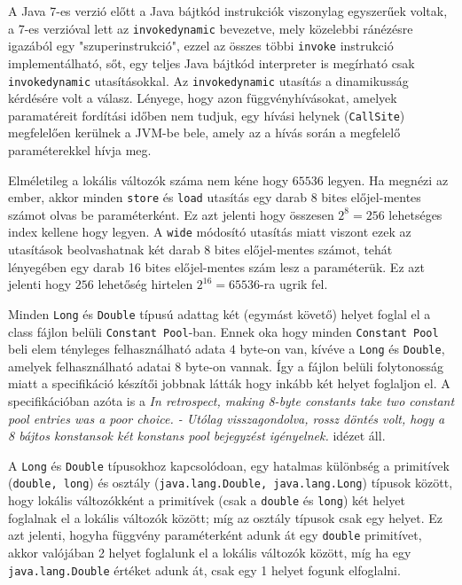 \begin{compactitem}
 \item A Java 7-es verzió előtt a Java bájtkód instrukciók viszonylag egyszerűek voltak, a 7-es verzióval lett az \lstinline{invokedynamic} bevezetve, mely közelebbi ránézésre igazából egy "szuperinstrukció", ezzel az összes többi \lstinline{invoke} instrukció implementálható, sőt, egy teljes Java bájtkód interpreter is megírható csak \lstinline{invokedynamic} utasításokkal. Az \lstinline{invokedynamic} utasítás a dinamikusság kérdésére volt a válasz. Lényege, hogy azon függvényhívásokat, amelyek paramatéreit fordítási időben nem tudjuk, egy hívási helynek (\lstinline{CallSite}) megfelelően kerülnek a JVM-be bele, amely az a hívás során a megfelelő paraméterekkel hívja meg.
 \item Elméletileg a lokális változók száma nem kéne hogy $65536$ legyen. Ha megnézi az ember, akkor minden \lstinline{store} és \lstinline{load} utasítás egy darab 8 bites előjel-mentes számot olvas be paraméterként. Ez azt jelenti hogy összesen $2^{8} = 256$ lehetséges index kellene hogy legyen. A \lstinline{wide} módosító utasítás miatt viszont ezek az utasítások beolvashatnak két darab 8 bites előjel-mentes számot, tehát lényegében egy darab 16 bites előjel-mentes szám lesz a paraméterük. Ez azt jelenti hogy $256$ lehetőség hirtelen $2^{16} = 65536$-ra ugrik fel.
 \item Minden \lstinline{Long} és \lstinline{Double} típusú adattag két (egymást követő) helyet foglal el a class fájlon belüli \lstinline{Constant Pool}-ban. Ennek oka hogy minden \lstinline{Constant Pool} beli elem tényleges felhasználható adata $4$ byte-on van, kívéve a \lstinline{Long} és \lstinline{Double}, amelyek felhasználható adatai $8$ byte-on vannak. Így a fájlon belüli folytonosság miatt a specifikáció készítői jobbnak látták hogy inkább két helyet foglaljon el. A specifikációban azóta is a \textit{In retrospect, making 8-byte constants take two constant pool entries was a poor choice. - Utólag visszagondolva, rossz döntés volt, hogy a 8 bájtos konstansok két konstans pool bejegyzést igényelnek.} idézet áll.
 \item A \lstinline{Long} és \lstinline{Double} típusokhoz kapcsolódoan, egy hatalmas különbség a primitívek (\lstinline{double, long}) és osztály (\lstinline{java.lang.Double, java.lang.Long}) típusok között, hogy lokális változókként a primitívek (csak a \lstinline{double} és \lstinline{long}) két helyet foglalnak el a lokális változók között; míg az osztály típusok csak egy helyet. Ez azt jelenti, hogyha függvény paraméterként adunk át egy \lstinline{double} primitívet, akkor valójában 2 helyet foglalunk el a lokális változók között, míg ha egy \lstinline{java.lang.Double} értéket adunk át, csak egy 1 helyet fogunk elfoglalni.
\end{compactitem}

